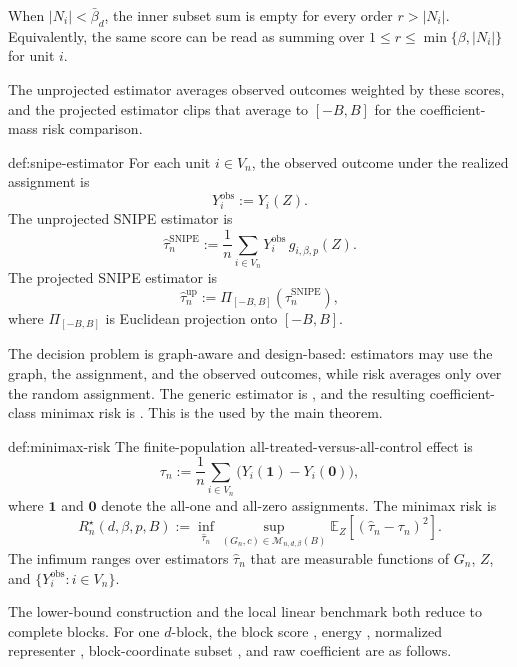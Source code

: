 When \(|N_i|<\bar\beta_d\), the inner subset sum is empty for every order \(r>|N_i|\). Equivalently, the same score can be read as summing over \(1\le r\le \min\{\beta,|N_i|\}\) for unit \(i\).

The unprojected estimator  averages observed outcomes weighted by these scores, and the projected estimator  clips that average to \([-B,B]\) for the coefficient-mass risk comparison.

\begin{definitionv}{def:snipe-estimator}
For each unit \(i\in V_n\), the observed outcome under the realized assignment is
\[
Y_i^{\mathrm{obs}}:=Y_i(Z).
\]
The unprojected SNIPE estimator is
\[
\widehat\tau_n^{\mathrm{SNIPE}}
:=
\frac{1}{n}
\sum_{i\in V_n}
Y_i^{\mathrm{obs}}\,g_{i,\beta,p}(Z).
\]
The projected SNIPE estimator is
\[
\widehat\tau_n^{\mathrm{up}}
:=
\Pi_{[-B,B]}
\left(
\widehat\tau_n^{\mathrm{SNIPE}}
\right),
\]
where \(\Pi_{[-B,B]}\) is Euclidean projection onto \([-B,B]\).
\end{definitionv}

The decision problem is graph-aware and design-based: estimators may use the graph, the assignment, and the observed outcomes, while risk averages only over the random assignment. The generic estimator is , and the resulting coefficient-class minimax risk is . This is the  used by the main theorem.

\begin{definitionv}{def:minimax-risk}
The finite-population all-treated-versus-all-control effect is
\[
\tau_n:=\frac{1}{n}\sum_{i\in V_n}\bigl(Y_i(\mathbf 1)-Y_i(\mathbf 0)\bigr),
\]
where \(\mathbf 1\) and \(\mathbf 0\) denote the all-one and all-zero assignments. The minimax risk is
\[
R_n^\star(d,\beta,p,B)
:=
\inf_{\widehat\tau_n}
\sup_{(G_n,c)\in\mathcal M_{n,d,\beta}(B)}
\mathbb E_Z
\left[
\left(
\widehat\tau_n-\tau_n
\right)^2
\right].
\]
The infimum ranges over estimators \(\widehat\tau_n\) that are measurable functions of \(G_n\), \(Z\), and \(\{Y_i^{\mathrm{obs}}:i\in V_n\}\).
\end{definitionv}

The lower-bound construction and the local linear benchmark both reduce to complete blocks. For one \(d\)-block, the block score , energy , normalized representer , block-coordinate subset , and raw coefficient  are as follows.

